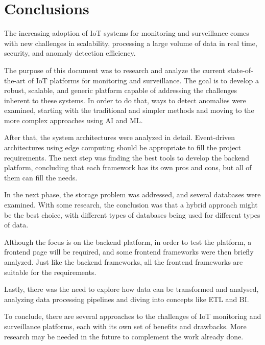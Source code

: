 

\chapter{Conclusions}
\label{cha:conclusions}

The increasing adoption of \gls{IoT} systems for monitoring and surveillance
comes with new challenges in scalability, processing a large volume of data in
real time, security, and anomaly detection efficiency.

The purpose of this document was to research and analyze the current state-of-the-art
of \gls{IoT} platforms for monitoring and surveillance. The goal is to develop
a robust, scalable, and generic platform capable of addressing the challenges
inherent to these systems. In order to do that, ways to detect anomalies were
examined, starting with the traditional and simpler methods and moving to the
more complex approaches using \gls{AI} and \gls{ML}.

After that, the system
architectures were analyzed in detail. Event-driven architectures using
edge computing should be appropriate to fill the project requirements. The next
step was finding the best tools to develop the backend platform, concluding that
each framework has its own pros and cons, but all of them can fill the needs.

In the next phase, the storage problem was addressed, and several databases were examined.
With some research, the conclusion was that a hybrid approach might be the best
choice, with different types of databases being used for different types of data.

Although the focus is on the backend platform, in order to test the platform,
a frontend page will be required, and some frontend frameworks were then briefly
analyzed. Just like the backend frameworks, all the frontend frameworks are
suitable for the requirements.

Lastly, there was the need to explore how data can be transformed and analysed,
analyzing data processing pipelines and diving into concepts like \gls{ETL}
and \gls{BI}.

To conclude, there are several approaches to the challenges of \gls{IoT} monitoring
and surveillance platforms, each with its own set of benefits and drawbacks.
More research may be needed in the future to complement the work already done.
